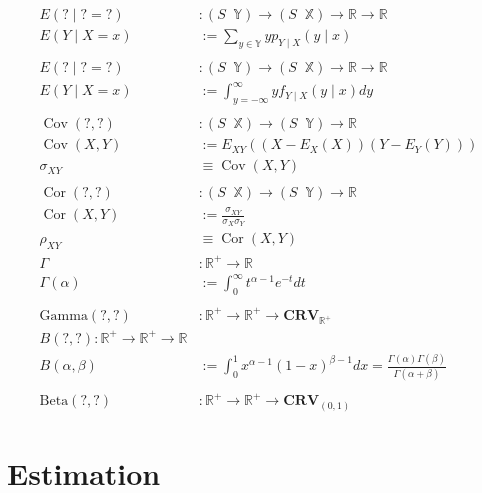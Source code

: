 \documentclass[12pt]{article}
\theoremstyle{definition}
\newcommand{\R}{\mathbb{R}}
\newcommand{\X}{\mathbb{X}}
\newcommand{\Y}{\mathbb{Y}}
\newcommand{\CRV}{\mathbf{CRV}}
\DeclareMathOperator{\Cov}{Cov}
\DeclareMathOperator{\Cor}{Cor}
\DeclareMathOperator{\rvto}{\xrightarrow{RV}}
\DeclareMathOperator{\drvto}{\xrightarrow{DRV}}
\DeclareMathOperator{\crvto}{\xrightarrow{CRV}}
\begin{document}
\begin{align*}
  E(? \mid ? = ?) &: (S \drvto \Y) \to (S \drvto \X) \to \R \to \R\\
  E(Y \mid X = x) &:= \sum_{y \in \Y}yp_{Y \mid X}(y \mid x)\\
  \\
  E(? \mid ? = ?) &: (S \crvto \Y) \to (S \crvto \X) \to \R \to \R\\
  E(Y \mid X = x) &:= \int_{y = -\infty}^{\infty}yf_{Y \mid X}(y \mid x)dy\\
  \\
  \Cov(?, ?) &: (S \rvto \X) \to (S \rvto \Y) \to \R\\
  \Cov(X, Y) &:= E_{XY}((X - E_X(X))(Y - E_Y(Y)))\\
  \sigma_{XY} &\equiv \Cov(X, Y)\\
  \\
  \Cor(?, ?) &: (S \rvto \X) \to (S \rvto \Y) \to \R\\
  \Cor(X, Y) &:= \frac{\sigma_{XY}}{\sigma_X\sigma_Y}\\
  \rho_{XY} &\equiv \Cor(X, Y)
  \\
  \Gamma &: \R^+ \to \R\\
  \Gamma(\alpha) &:= \int_0^{\infty}t^{\alpha - 1}e^{-t}dt\\
  \\
  \text{Gamma}(?, ?) &: \R^+ \to \R^+ \to \CRV_{\R^+}\\
  B(?, ?) : \R^+ \to \R^+ \to \R\\
  B(\alpha, \beta) &:= \int_0^1x^{\alpha - 1}(1 - x)^{\beta - 1}dx = \frac{\Gamma(\alpha)\Gamma(\beta)}{\Gamma(\alpha + \beta)}\\
  \\
  \text{Beta}(?, ?) &: \R^+ \to \R^+ \to \CRV_{(0, 1)}
\end{align*}

\section{Estimation}
\end{document}
